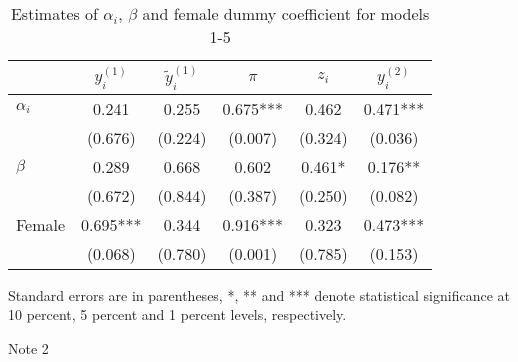 \begin{table}[!h]\caption{Estimates of $\alpha_i$, $\beta$ and female dummy coefficient for models 1-5}\centering 
\begin{threeparttable} 
\begin{tabular}{|l|*{5}{c}|}\toprule 
& $y^{(1)}_i$ & $\tilde{y}^{(1)}_i$& $\pi$& $z_i$& $y^{(2)}_i$\\ \midrule 
$\alpha_i$& 0.241 & 0.255 & 0.675*** & 0.462 & 0.471*** \\ 
& (0.676) & (0.224) & (0.007) & (0.324) & (0.036) \\ 
$\beta$& 0.289 & 0.668 & 0.602 & 0.461* & 0.176** \\ 
& (0.672) & (0.844) & (0.387) & (0.250) & (0.082) \\ 
Female& 0.695*** & 0.344 & 0.916*** & 0.323 & 0.473*** \\ 
& (0.068) & (0.780) & (0.001) & (0.785) & (0.153) \\ 
\bottomrule \end{tabular} 
\begin{tablenotes} 
\item Standard errors are in parentheses, *, ** and *** denote statistical significance at 10 percent, 5 percent and 1 percent levels, respectively. \\ 
\item Note 2 
\end{tablenotes} 
\end{threeparttable} 
\end{table} 
